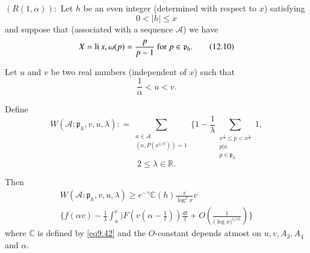 \setcounter{section}{12}
\setcounter{theorem}{0}
\begin{theorem}\label{chap12-thm12.1}
$(R(1,\alpha)):$ Let $h$ be an even integer (determined with respect
  to $x$)  satisfying  
\begin{equation*}
0 < |h| \leq x \tag{12.9}\label{eq12.9}
\end{equation*}\pageoriginale
and suppose that (associated with a sequence $\mathscr{A}$) we have
\begin{equation*}
X=\operatorname{li} x, \omega(p)=\frac{p}{p-1} \text{ for } p \in
\mathfrak{p}_h. \tag{12.10}\label{eq12.10} 
\end{equation*}

Let $u$ and $v$ be two real numbers (independent of $x$) such that
\begin{equation*}
\frac{1}{\alpha}<u<v. \tag{12.11}\label{eq12.11}
\end{equation*}

Define
\begin{equation*}
W(\mathscr{A};\mathfrak{p}_h,v ,u, \lambda): = \sum_{\substack{a \in
    \mathscr{A} \\ (a, P(x^{1/V}))=1}} \{1-\frac{1}{\lambda}
\sum_{\substack{x^{\frac{1}{v}} \leq p < x^{\frac{1}{u}}\\p | a \\ p
    \in \mathfrak{p}_h}}1, \tag{12.12}\label{eq12.12} 
\end{equation*}
\begin{equation*}
2 \leq \lambda \in \mathbb{R}. \tag{12.13}\label{eq12.13}
\end{equation*}
\end{theorem}

Then
\begin{gather*}
W(\mathscr{A}:\mathfrak{p}_h,v,u,\lambda) \geq e^{-\gamma}
\mathbb{C}(h)\frac{x}{\log^2 x}v\\
 \bigg\{f(\alpha v)-\frac{1}{\lambda}
\int _u ^v)F(v(\alpha-\frac{1}{t}))\frac{dt}{t}+O(\frac{1}{({\log
    x)^{1/15}}})\bigg\} \tag{12.14}\label{eq12.14} 
\end{gather*}
where $\mathbb{C}$ is defined by \eqref{eq9.42} and the $O$-constant depends
atmost on $u,v,A_3,A_4$ and $\alpha$. 


